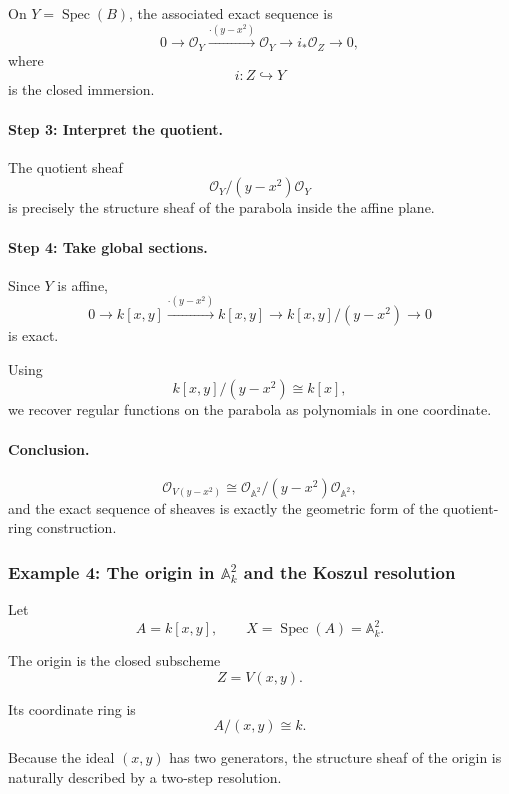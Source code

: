 \documentclass[12pt,a4paper]{article}
\theoremstyle{notespace}
\begin{document}
On \(Y=\operatorname{Spec}(B)\), the associated exact sequence is
\[
0
\longrightarrow
\mathcal{O}_{Y}
\xrightarrow{\cdot (y-x^{2})}
\mathcal{O}_{Y}
\longrightarrow
i_{*}\mathcal{O}_{Z}
\longrightarrow
0,
\]
where
\[
i:Z\hookrightarrow Y
\]
is the closed immersion.

\paragraph{Step 3: Interpret the quotient.}

The quotient sheaf
\[
\mathcal{O}_{Y}/(y-x^{2})\mathcal{O}_{Y}
\]
is precisely the structure sheaf of the parabola inside the affine plane.

\paragraph{Step 4: Take global sections.}

Since \(Y\) is affine,
\[
0
\longrightarrow
k[x,y]
\xrightarrow{\cdot (y-x^{2})}
k[x,y]
\longrightarrow
k[x,y]/(y-x^{2})
\longrightarrow
0
\]
is exact.

Using
\[
k[x,y]/(y-x^{2})\cong k[x],
\]
we recover regular functions on the parabola as polynomials in one
coordinate.

\paragraph{Conclusion.}

\[
\boxed{
	\mathcal{O}_{V(y-x^{2})}
	\cong
	\mathcal{O}_{\mathbb{A}^{2}}/
	(y-x^{2})\mathcal{O}_{\mathbb{A}^{2}},
}
\]
and the exact sequence of sheaves is exactly the geometric form of the
quotient-ring construction.

\subsubsection{Example 4: The origin in \texorpdfstring{\(\mathbb{A}^{2}_{k}\)}{A2} and the Koszul resolution}

Let
\[
A=k[x,y],
\qquad
X=\operatorname{Spec}(A)=\mathbb{A}^{2}_{k}.
\]

The origin is the closed subscheme
\[
Z=V(x,y).
\]

Its coordinate ring is
\[
A/(x,y)\cong k.
\]

Because the ideal \((x,y)\) has two generators, the structure sheaf of the
origin is naturally described by a two-step resolution.
\end{document}

